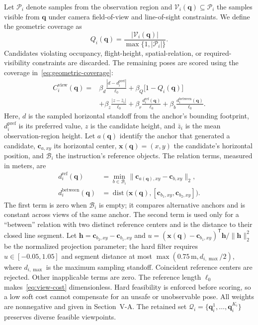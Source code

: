 \documentclass[letterpaper,10pt,journal]{IEEEtran}
\begin{document}
Let $\mathcal P_i$ denote samples from the observation region and $\mathcal V_i(\mathbf{q})\subseteq\mathcal P_i$ the samples visible from $\mathbf{q}$ under camera field-of-view and line-of-sight constraints. We define the geometric coverage as
\begin{equation}
Q_i(\mathbf{q})=
\frac{\lvert\mathcal V_i(\mathbf{q})\rvert}
{\max\{1,\lvert\mathcal P_i\rvert\}}.
\label{eq:geometric-coverage}
\end{equation}
Candidates violating occupancy, flight-height, spatial-relation, or required-visibility constraints are discarded. The remaining poses are scored using the coverage in~\eqref{eq:geometric-coverage}:
\begin{equation}
\begin{aligned}
C_i^{\mathrm{view}}(\mathbf{q})={}&
\beta_d\frac{|d-d_i^{\mathrm{pref}}|}{\ell_0}
+\beta_Q\bigl[1-Q_i(\mathbf{q})\bigr]\\
&+\beta_z\frac{|z-\bar z_i|}{\ell_0}
+\beta_r\frac{d_i^{\mathrm{ref}}(\mathbf{q})}{\ell_0}
+\beta_b\frac{d_i^{\mathrm{between}}(\mathbf{q})}{\ell_0}.
\end{aligned}
\label{eq:view-cost}
\end{equation}
Here, $d$ is the sampled horizontal standoff from the anchor's bounding footprint, $d_i^{\mathrm{pref}}$ is its preferred value, $z$ is the candidate height, and $\bar z_i$ is the mean observation-region height. Let $a(\mathbf q)$ identify the anchor that generated a candidate, $\mathbf c_{a,xy}$ its horizontal center, $\mathbf x(\mathbf q)=(x,y)$ the candidate's horizontal position, and $\mathcal B_i$ the instruction's reference objects. The relation terms, measured in meters, are
\begin{equation}
\begin{aligned}
d_i^{\mathrm{ref}}(\mathbf q)
&=\min_{b\in\mathcal B_i}\|\mathbf c_{a(\mathbf q),xy}-\mathbf c_{b,xy}\|_2,\\
d_i^{\mathrm{between}}(\mathbf q)
&=\operatorname{dist}\bigl(\mathbf x(\mathbf q),
[\mathbf c_{b_1,xy},\mathbf c_{b_2,xy}]\bigr).
\end{aligned}
\label{eq:relation-costs}
\end{equation}
The first term is zero when $\mathcal B_i$ is empty; it compares alternative anchors and is constant across views of the same anchor. The second term is used only for a ``between'' relation with two distinct reference centers and is the distance to their closed line segment. Let $\mathbf h=\mathbf c_{b_2,xy}-\mathbf c_{b_1,xy}$ and $u=(\mathbf x(\mathbf q)-\mathbf c_{b_1,xy})^{\mathsf T}\mathbf h/\|\mathbf h\|_2^2$ be the normalized projection parameter; the hard filter requires $u\in[-0.05,1.05]$ and segment distance at most $\max(0.75\,\mathrm m,d_{i,\max}/2)$, where $d_{i,\max}$ is the maximum sampling standoff. Coincident reference centers are rejected. Other inapplicable terms are zero. The reference length $\ell_0$ makes~\eqref{eq:view-cost} dimensionless. Hard feasibility is enforced before scoring, so a low soft cost cannot compensate for an unsafe or unobservable pose. All weights are nonnegative and given in Section~V-A. The retained set $\mathcal Q_i=\{\mathbf q_i^1,\ldots,\mathbf q_i^{K_i}\}$ preserves diverse feasible viewpoints.
\end{document}
